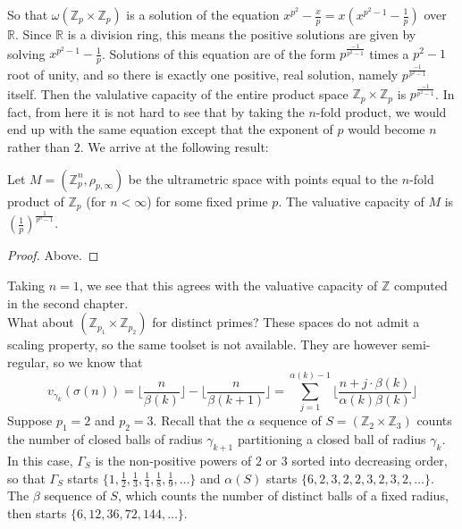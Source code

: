 So that $\omega(\mathbb{Z}_p \times \mathbb{Z}_p)$ is a solution of the equation $x^{p^2} - \frac{x}{p} = x(x^{p^2-1} - \frac{1}{p})$ over $\mathbb{R}$. Since $\mathbb{R}$ is a division ring, this means the positive solutions are given by solving $x^{p^2-1}-\frac{1}{p}$. Solutions of this equation are of the form $p^{\frac{-1}{p^2-1}}$ times a $p^2-1$ root of unity, and so there is exactly one positive, real solution, namely $p^{\frac{-1}{p^2-1}}$ itself. Then the valulative capacity of the entire product space $\mathbb{Z}_p \times \mathbb{Z}_p$ is $p^{\frac{-1}{p^2-1}}$. In fact, from here it is not hard to see that by taking the $n$-fold product, we would end up with the same equation except that the exponent of $p$ would become $n$ rather than $2$. We arrive at the following result:

\begin{proposition}
Let $M=(\mathbb{Z}_p^n, \rho_{p, \infty})$ be the ultrametric space with points equal to the $n$-fold product of $\mathbb{Z}_p$ (for $n < \infty$) for some fixed prime $p$. The valuative capacity of $M$ is  $(\frac{1}{p})^{\frac{1}{p^n-1}}$.
\end{proposition}

\begin{proof}
Above.
\end{proof}

Taking $n=1$, we see that this agrees with the valuative capacity of $\mathbb{Z}$ computed in the second chapter. \\

What about $(\mathbb{Z}_{p_1} \times \mathbb{Z}_{p_2})$ for distinct primes? These spaces do not admit a scaling property, so the same toolset is not available. They are however semi-regular, so we know that  \[v_{\gamma_k}(\sigma(n)) =  \lfloor\frac{n}{\beta(k)}\rfloor - \lfloor\frac{n}{\beta(k+1)}\rfloor = \sum_{j=1}^{\alpha(k)-1} \lfloor \frac{n + j\cdot \beta(k)}{\alpha(k)\beta(k)} \rfloor \]
Suppose $p_1 =2$ and $p_2 =3$. Recall that the $\alpha$ sequence of $S=(\mathbb{Z}_{2} \times \mathbb{Z}_{3})$ counts the number of closed balls of radius $\gamma_{k+1}$ partitioning a closed ball of radius $\gamma_k$. In this case, $\Gamma_S$ is the non-positive powers of $2$ or $3$ sorted into decreasing order, so that $\Gamma_S$ starts $\{1, \frac{1}{2},\frac{1}{3},\frac{1}{4},\frac{1}{8},\frac{1}{9},\ldots \}$ and $\alpha(S)$ starts $\{6,2,3,2,2,3,2,3,2,\ldots\}$. The $\beta$ sequence of $S$, which counts the number of distinct balls of a fixed radius, then starts $\{6,12,36,72,144,\ldots\}$.\\

